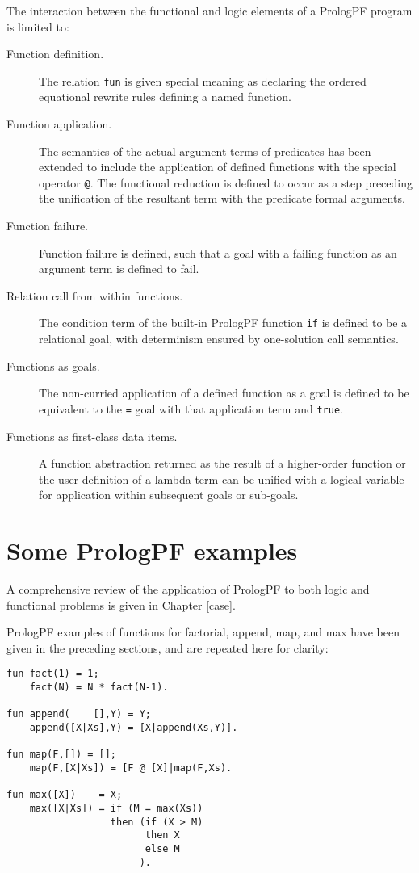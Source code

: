 The interaction between the functional and logic elements of a PrologPF
program is limited to:
\begin{description}
\item[Function definition.]{The relation \texttt{fun} is given special meaning as
  declaring the ordered equational rewrite rules defining a named function.}
\item[Function application.]{The semantics of the actual argument
  terms of predicates has been extended to
  include the application of defined functions
  with the special operator \texttt{@}.  The functional reduction
  is defined to occur as a step preceding the unification of the resultant term
  with the predicate formal arguments.}
\item[Function failure.]{Function failure is defined, such that a goal with a failing
  function as an argument term is defined to fail.}
\item[Relation call from within functions.]{The condition term of the built-in
  PrologPF function \texttt{if} is defined to be a relational goal, with determinism
  ensured by one-solution call semantics.}
\item[Functions as goals.]{The non-curried application of a defined function as a goal is
  defined to be equivalent to the \texttt{=} goal with that application term and
  \texttt{true}.}
\item[Functions as first-class data items.]{A function abstraction returned as the
  result of a higher-order function or the user definition of a lambda-term can be
  unified with a logical variable for application within subsequent goals or sub-goals.}
\end{description}

\section{Some PrologPF examples} %

A comprehensive review of the application of PrologPF to both logic and functional
problems is given in Chapter \ref{case}.

PrologPF examples of functions for factorial, append, map, and max 
have been given in
the preceding sections, and are repeated here for clarity:
\begin{verbatim}
fun fact(1) = 1;
    fact(N) = N * fact(N-1).

fun append(    [],Y) = Y;
    append([X|Xs],Y) = [X|append(Xs,Y)].

fun map(F,[]) = [];
    map(F,[X|Xs]) = [F @ [X]|map(F,Xs).

fun max([X])    = X;
    max([X|Xs]) = if (M = max(Xs))
                  then (if (X > M)
                        then X
                        else M
                       ).
\end{verbatim}


